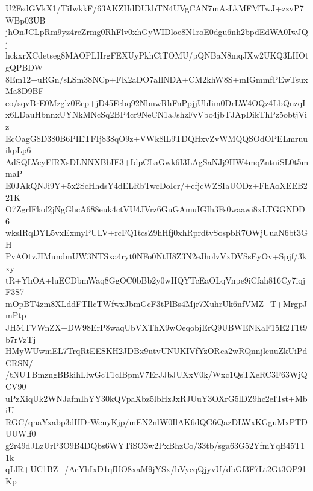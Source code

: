 U2FsdGVkX1/TiIwkkF/63AKZHdDUkbTN4UVgCAN7mAsLkMFMTwJ+zzvP7WBp03UB
jhOnJCLpRm9yz4reZrmg0RhFlv0xhGyWIDloe8N1roE0dgu6nh2bpdEdWA0IwJQj
hckxrXCdetseg8MAOPLHrgFEXUyPkhCiTOMU/pQNBaN8mqJXw2UKQ3LHOtgQPBDW
8Em12+uRGn/sLSm38NCp+FK2aDO7aIlNDA+CM2khW8S+mIGmmfPEwTsuxMa8D9BF
eo/sqvBrE0Mzglz0Eep+jD45Febq92NbnwRhFnPpjjUbIim0DrLW4OQz4LbQnzqI
x6LDauHbnnxUYNkMNcSq2BP4cr9NeCN1aJshzFvVbo4jbTJApDikThPz5obtjViz
EcOagG8D380B6PIETFIj838qO9z+VWk8lL9TDQHxvZvWMQQSOdOPELmruuikpLp6
AdSQLVeyFfRXsDLNNXBbIE3+IdpCLaGwk6I3LAgSaNJj9HW4mqZntniSL0t5mmaP
E0JAkQNJi9Y+5x2ScHhdsY4dELRbTwcDoIcr/+cfjcWZSIaUODz+FhAoXEEB221K
O7ZgrlFkof2jNgGhcA688euk4ctVU4JVrz6GuGAmuIGIh3Fs0waawi8xLTGGNDD6
wksIRqDYL5vxExmyPULV+rcFQ1tcsZ9hHfj0xhRprdtvSospbR7OWjUuaN6bt3GH
PvAOtvJIMundmUW3NTSxa4ryt0NFo0NtH8Z3N2eJholvVxDVSsEyOv+Spjf/3kxy
tR+YhOA+luECDbmWaq8GgOC0bBb2y0wHQYTcEaOLqVnpe9iCfah816Cy7iqjF3S7
mOpBT4zm8XLddFTIlcTWfwxJbmGcF3tPlBs4Mjr7XuhrUk6nfVMZ+T+MrgpJmPtp
JH54TVWnZX+DW98ErP8waqUbVXThX9wOeqobjErQ9UBWENKaF15E2T1t9b7rVzTj
HMyWUwmEL7TrqRtEESKH2JDBx9utvUNUKIVfYzORca2wRQnnjlcuuZkUiPdCRSN/
/tNUTBmzngBBkihLlwGcT1cIBpmV7ErJJbJUXxV0k/Wxc1QsTXeRC3F63WjQCV90
uPzXiqUk2WNJafmIhYY30kQVpaXbz5lbHzJxRJUuY3OXrG5lDZ9hc2eITst+MbiU
RGC/qnaYxabp3dHDrWeuyKjp/mEN2nlW0IlAK6dQG6QazDLWxKGguMxPTDUUWlf0
g2r49dJLzUrP3O9B4DQbs6WYTiSO3w2PxBhzCo/33tb/sga63G52YfmYqB45T11k
qLlR+UC1BZ+/AcYhIxD1qfUO8xaM9jYSx/bVycqQjyvU/dbGf3F7Lt2Gt3OP91Kp
